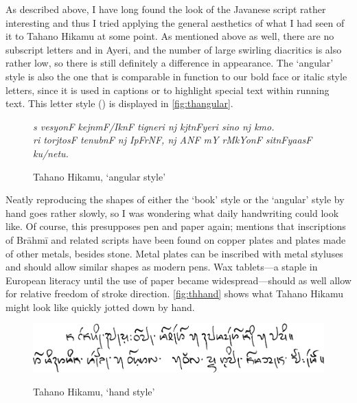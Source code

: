 As described above, I have long found the look of the Javanese script rather 
interesting and thus I tried applying the general aesthetics of what I had 
seen of it to Tahano Hikamu at some point. As mentioned above as well, there are 
no subscript letters and in Ayeri, and the number of large swirling diacritics 
is also rather low, so there is still definitely a difference in appearance. 
The `angular' style is also the one that is comparable in function to our bold 
face or italic style letters, since it is used in captions or to highlight 
special text within running text. This letter style 
() is displayed in \autoref{fig:thangular}. 

\begin{figure}[ht]\centering
\caption{Tahano Hikamu, `angular style'}
{\Tagati\itshape\Large s vesyonF kejnmF/IknF tigneri nj kjtnFyeri sino nj kmo.\\
ri torjtosF tenubnF nj IpFrNF, nj ANF mY rMkYonF sitnFyaasF ku/netu.}
\label{fig:thangular}
\end{figure}

Neatly reproducing the shapes of either the `book' style or the `angular' 
style by hand goes rather slowly, so I was wondering what daily handwriting 
could look like. Of course, this presupposes pen and paper again;
\citet[377]{salomon1996} mentions that inscriptions of Brāhmī and related 
scripts have been found on copper plates and plates made of other metals, 
besides stone. Metal plates can be inscribed with metal styluses and should 
allow similar shapes as modern pens. Wax tablets---a staple in European literacy 
until the use of paper became widespread---should as well allow for relative 
freedom of stroke direction.
\autoref{fig:thhand} shows what Tahano Hikamu might look like quickly jotted 
down by hand.

\begin{figure}[ht]\centering
\caption{Tahano Hikamu, `hand style'}
\includegraphics[width=0.75\linewidth]{images/tahanohand-300dpi-bw.png}
\label{fig:thhand}
\end{figure}

